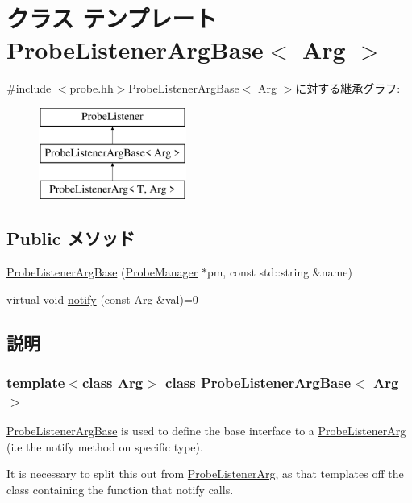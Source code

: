 \hypertarget{classProbeListenerArgBase}{
\section{クラス テンプレート ProbeListenerArgBase$<$ Arg $>$}
\label{classProbeListenerArgBase}
}


{\ttfamily \#include $<$probe.hh$>$}ProbeListenerArgBase$<$ Arg $>$に対する継承グラフ:\begin{figure}[H]
\begin{center}
\leavevmode
\includegraphics[height=3cm]{classProbeListenerArgBase}
\end{center}
\end{figure}
\subsection*{Public メソッド}
\begin{DoxyCompactItemize}
\item 
\hyperlink{classProbeListenerArgBase_acd3780c8a8392c3fe3d71ac5aa7d34a0}{ProbeListenerArgBase} (\hyperlink{classProbeManager}{ProbeManager} $\ast$pm, const std::string \&name)
\item 
virtual void \hyperlink{classProbeListenerArgBase_ab47404eccdea3a95766588b12953baf5}{notify} (const Arg \&val)=0
\end{DoxyCompactItemize}


\subsection{説明}
\subsubsection*{template$<$class Arg$>$ class ProbeListenerArgBase$<$ Arg $>$}

\hyperlink{classProbeListenerArgBase}{ProbeListenerArgBase} is used to define the base interface to a \hyperlink{classProbeListenerArg}{ProbeListenerArg} (i.e the notify method on specific type).

It is necessary to split this out from \hyperlink{classProbeListenerArg}{ProbeListenerArg}, as that templates off the class containing the function that notify calls. 

